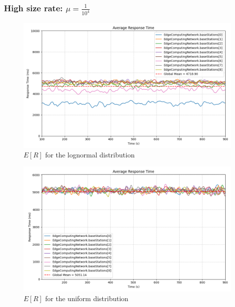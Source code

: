 \documentclass{report}
\begin{document}
\subsubsection*{High size rate: $\mu=\frac{1}{10^4}$}

\begin{figure}[H]
    \centering
    \includegraphics[width=\textwidth]{img/plots/log_1e4_A/resptime.png}
    \caption{$E[R]$ for the lognormal distribution}
\end{figure}

\begin{figure}[H]
    \centering
    \includegraphics[width=\textwidth]{img/plots/uni_1e4_A/resptime.png}
    \caption{$E[R]$ for the uniform distribution}
\end{figure}
\end{document}
